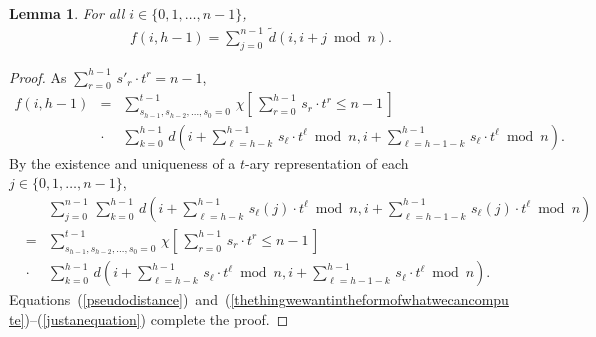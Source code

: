 \documentclass[letterpaper,12pt]{article}
\newtheorem{lemma}[theorem]{Lemma}
\begin{document}
\begin{lemma}\label{theDPresultisthesumofpseudodistanceslemma}
For all $i\in\{0,1,\ldots,n-1\}$,
\begin{eqnarray}
f\left(i,h-1\right)
=\sum_{j=0}^{n-1}\,
\tilde{d}\left(i,i+j\bmod{n}
\right).
\nonumber
\end{eqnarray}
\end{lemma}
\begin{proof}
As $\sum_{r=0}^{h-1}\,s'_r\cdot t^r= n-1$,
\begin{eqnarray}
f\left(i,h-1\right)
&=&
\sum_{s_{h-1},s_{h-2},\ldots,s_0=0}^{t-1}\,
\chi\left[\,\sum_{r=0}^{h-1}\,s_r\cdot t^r\le n-1\,\right]
\nonumber\\
&\cdot&
\sum_{k=0}^{h-1}\,
d\left(
i+\sum_{\ell=h-k}^{h-1}\,s_\ell\cdot t^\ell \bmod{n},
i+\sum_{\ell=h-1-k}^{h-1}\,s_\ell\cdot t^\ell \bmod{n}
\right).
\,\,\,\,\,\label{thethingwewantintheformofwhatwecancompute}
\end{eqnarray}
By the existence and uniqueness of a $t$-ary representation
of each
$j\in\{0,1,\ldots,n-1\}$,
\begin{eqnarray}
&&\sum_{j=0}^{n-1}\,
\sum_{k=0}^{h-1}\,
d\left(
i+\sum_{\ell=h-k}^{h-1}\,s_\ell(j)\cdot t^\ell \bmod{n},
i+\sum_{\ell=h-1-k}^{h-1}\,s_\ell(j)\cdot t^\ell \bmod{n}
\right)
\nonumber\\
&=&
\sum_{s_{h-1},s_{h-2},\ldots,s_0=0}^{t-1}\,
\chi\left[\,\sum_{r=0}^{h-1}\,s_r\cdot t^r\le n-1\,\right]
\nonumber\\
&\cdot&
\sum_{k=0}^{h-1}\,
d\left(
i+\sum_{\ell=h-k}^{h-1}\,s_\ell\cdot t^\ell \bmod{n},
i+\sum_{\ell=h-1-k}^{h-1}\,s_\ell\cdot t^\ell \bmod{n}
\right).
\label{justanequation}
\end{eqnarray}
Equations~(\ref{pseudodistance})~and~(\ref{thethingwewantintheformofwhatwecancompute})--(\ref{justanequation})
complete the proof.
\end{proof}
\end{document}
